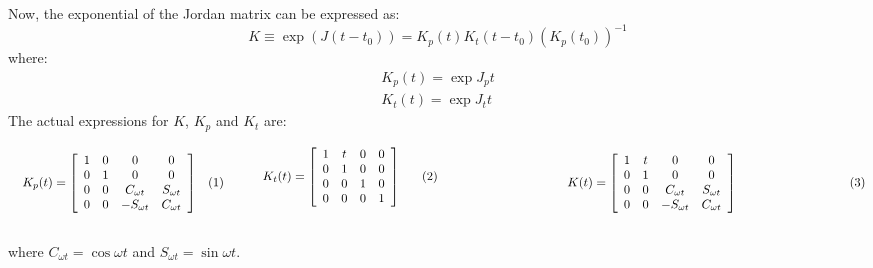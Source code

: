 		\vspace{1em}
		\indent Now, the exponential of the Jordan matrix can be expressed as:
		\begin{equation}
		K \equiv \exp \left(J(t - t_0)\right) = K_p(t) K_t(t - t_0) \left(K_p(t_0)\right)^{-1}
		\label{eqCh2:K_decomp}
		\end{equation}
		\noindent where:
		\begin{subequations}
		\begin{alignat}{4}
		K_p(t) = \exp J_p t\\
		K_t(t) = \exp J_t t
		\end{alignat}
		\end{subequations}
		\indent The actual expressions for $K$, $K_p$ and $K_t$ are:\\
		\vspace{1em}
		\begin{subequations}
		\begin{minipage}{.5\linewidth}
		\begin{equation}
		  K_p(t) = \left[ \begin{array}{cccc}
			1 	& 0	& 0		& 0			\\
			0 	& 1	& 0  				& 0 		\\
			0 	& 0	& C_{\omega t}		& S_{\omega t}	\\
			0 	& 0	& - S_{\omega t}	& C_{\omega t}
		\end{array}\right]
		\label{eqCh2:Kp_exp}
		\end{equation}
		\end{minipage}
		\begin{minipage}{.5\linewidth}
		\begin{equation}
		 K_t(t) = \left[ \begin{array}{cccc}
			1 	& t	& 0	& 0	\\
			0 	& 1	& 0 & 0 	\\
			0 	& 0	& 1	& 0	\\
			0 	& 0	& 0	& 1
			\end{array}\right]
			\label{eqCh2:Kt_exp}
		\end{equation}
		\end{minipage}
		\begin{minipage}{\linewidth}
		\begin{center}
		\begin{equation}
		  K(t) = \left[ \begin{array}{cccc}
			1 	& t	& 0		& 0			\\
			0 	& 1	& 0  				& 0 		\\
			0 	& 0	& C_{\omega t}		& S_{\omega t}	\\
			0 	& 0	& - S_{\omega t}	& C_{\omega t}
		\end{array}\right]
		\label{eqCh2:K_exp}
		\end{equation}
		\end{center}
		\end{minipage}
		\end{subequations}\\
		\noindent where $C_{\omega t} = \cos\omega t$ and $S_{\omega t} = \sin\omega t$.
%

